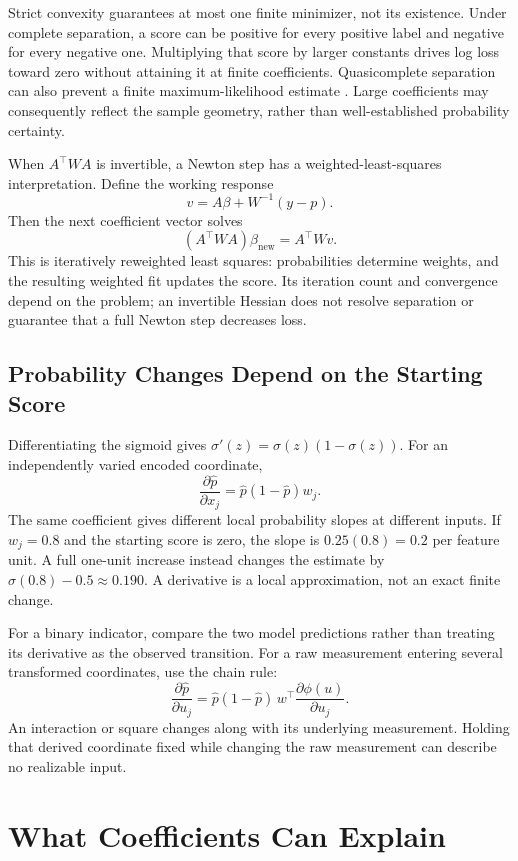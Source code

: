 Strict convexity guarantees at most one finite minimizer, not its existence. Under complete separation, a score can be positive for every positive label and negative for every negative one. Multiplying that score by larger constants drives log loss toward zero without attaining it at finite coefficients. Quasicomplete separation can also prevent a finite maximum-likelihood estimate \citep{albert1984separation}. Large coefficients may consequently reflect the sample geometry, rather than well-established probability certainty.

When $A^\top WA$ is invertible, a Newton step has a weighted-least-squares interpretation. Define the working response
\[
v=A\beta+W^{-1}(y-p).
\]
Then the next coefficient vector solves
\[
(A^\top WA)\beta_{\mathrm{new}}=A^\top Wv.
\]
This is iteratively reweighted least squares: probabilities determine weights, and the resulting weighted fit updates the score. Its iteration count and convergence depend on the problem; an invertible Hessian does not resolve separation or guarantee that a full Newton step decreases loss.

\subsection{Probability Changes Depend on the Starting Score}

Differentiating the sigmoid gives $\sigma'(z)=\sigma(z)(1-\sigma(z))$. For an independently varied encoded coordinate,
\[
\frac{\partial\hat p}{\partial x_j}=\hat p(1-\hat p)w_j.
\]
The same coefficient gives different local probability slopes at different inputs. If $w_j=0.8$ and the starting score is zero, the slope is $0.25(0.8)=0.2$ per feature unit. A full one-unit increase instead changes the estimate by $\sigma(0.8)-0.5\approx0.190$. A derivative is a local approximation, not an exact finite change.

For a binary indicator, compare the two model predictions rather than treating its derivative as the observed transition. For a raw measurement entering several transformed coordinates, use the chain rule:
\[
\frac{\partial\hat p}{\partial u_j}
=\hat p(1-\hat p)\,w^\top\frac{\partial\phi(u)}{\partial u_j}.
\]
An interaction or square changes along with its underlying measurement. Holding that derived coordinate fixed while changing the raw measurement can describe no realizable input.

\section{What Coefficients Can Explain}

